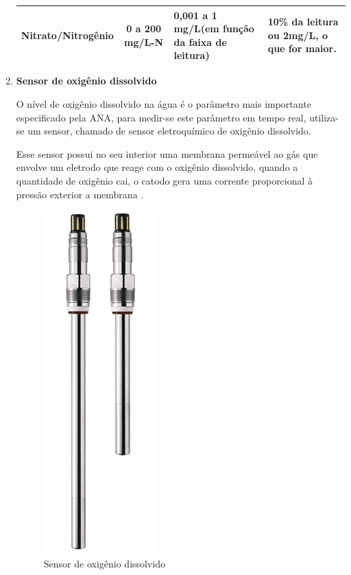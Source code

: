\begin{enumerate}
\begin{table}[h]
\begin{tabular}{|c|c|p{6cm}|p{5cm}|}
	\hline
	Nitrato/Nitrogênio &
	0 a 200 mg/L-N &
	0,001 a 1 mg/L(em função da faixa de leitura) &
	10\% da leitura ou 2mg/L, o que for maior.\\
	\hline

	\end{tabular}
	\end{table}
    
    \item \textbf{Sensor de oxigênio dissolvido}
    
	O nível de oxigênio dissolvido na água é o parâmetro mais importante especificado pela ANA,
	para medir-se este parâmetro em tempo real, utiliza-se um sensor, chamado de sensor eletroquímico
	de oxigênio dissolvido.
	
	Esse sensor possui no seu interior uma membrana permeável ao gás que envolve um eletrodo que reage com
	o oxigênio dissolvido, quando a quantidade de oxigênio cai, o catodo gera uma corrente proporcional à
	pressão exterior a membrana \cite{ferreira07}.
	
	\begin{figure}[!h]
	  \centering
	  \includegraphics[scale=0.4]{editaveis/figuras/sensor_oxigenio}
	  \caption[Sensor de oxigênio dissolvido]{Sensor de oxigênio dissolvido}
	  \FloatBarrier
	  \label{sensor_oxigenio}
	 \end{figure}
	

\end{enumerate}
